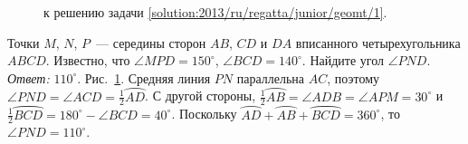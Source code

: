 \ifsolution
\begin{figure}\centering
    \caption{к решению задачи \ref{solution:2013/ru/regatta/junior/geomt/1}.}
    \label{fig:solution:2013/ru/regatta/junior/geomt/1}
\end{figure}%
\fi %


\problem
Точки $M$, $N$, $P$~--- середины сторон $AB$, $CD$ и $DA$ вписанного
четырехугольника $ABCD$.
Известно, что $\angle MPD = 150^\circ$, $\angle BCD = 140^\circ$.
Найдите угол $\angle PND$. 
\solution%
\label{solution:2013/ru/regatta/junior/geomt/1}%
\emph{Ответ:} $110^\circ$.
Рис.~\ref{fig:solution:2013/ru/regatta/junior/geomt/1}.
Средняя линия $PN$ параллельна $AC$, поэтому
$\angle PND = \angle ACD = \frac{1}{2} \wideparen{AD}$.
С другой стороны,
$\frac{1}{2} \wideparen{AB} = \angle ADB = \angle APM = 30^\circ$
и $\frac{1}{2} \wideparen{BCD} = 180^\circ - \angle BCD = 40^\circ$.
Поскольку
$\wideparen{AD} + \wideparen{AB} + \wideparen{BCD} = 360^\circ$,
то $\angle PND = 110^\circ$.
\endproblem
